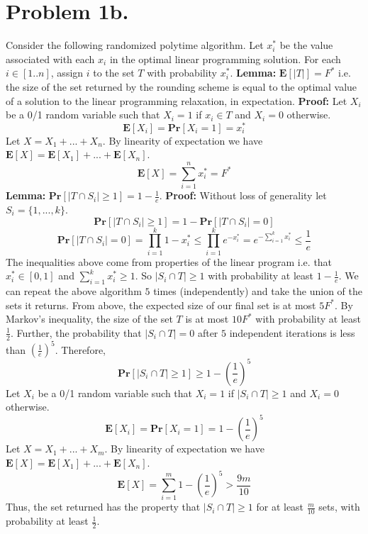 \documentclass[12pt]{article}
\begin{document}
\section*{Problem 1b.}
Consider the following randomized polytime algorithm. Let $x^*_i$ be the value
associated with each $x_i$ in the optimal linear programming solution. For each
$i \in [1..n]$, assign $i$ to the set $T$ with probability $x^*_i$.
\vspace{2mm}
\newline
\textbf{Lemma:} $\textbf{E}[|T|] = F^*$ i.e. the size of the set returned
by the rounding scheme is equal to the optimal value of a solution to the linear
programming relaxation, in expectation.
\vspace{2mm}
\newline
\textbf{Proof:} Let $X_i$ be a 0/1 random variable such that
$X_i = 1$ if $x_i \in T$ and $X_i = 0$ otherwise.
$$\textbf{E}[X_i] = \textbf{Pr}[X_i = 1] = x^*_i$$
Let $X = X_1 + ... + X_n$. By linearity of expectation we have
$\textbf{E}[X] = \textbf{E}[X_1] + ... + \textbf{E}[X_n]$.
$$\textbf{E}[X] = \sum^n_{i=1} x^*_i = F^*$$
\newpage
\noindent
\textbf{Lemma:} $\textbf{Pr}[|T\cap S_i|\ge 1] = 1 - \frac{1}{e}$.
\vspace{2mm}
\newline
\textbf{Proof:} Without loss of generality let $S_i = \{1,...,k\}$.
$$\textbf{Pr}[|T\cap S_i| \ge 1] = 1 - \textbf{Pr}[|T\cap S_i| = 0]$$
$$ \textbf{Pr}[|T\cap S_i| = 0] =
\prod_{i=1}^k 1-x^*_i \le \prod_{i=1}^k e^{-x^*_i}
= e^{-\sum^k_{i=1} x^*_i} \le \frac{1}{e}$$
The inequalities above come from properties of the linear program i.e. that
$x^*_i \in [0,1]$ and $\sum^k_{i=1} x^*_i \ge 1$. So $|S_i \cap T| \ge 1$ with
probability at least $1-\frac{1}{e}$.
\vspace{4mm}
\newline
We can repeat the above algorithm $5$ times (independently) and take the union
of the sets it returns. From above, the expected size of our final set is at
most $5F^*$. By Markov's inequality, the size of the set $T$ is at most
$10F^*$ with probability at least $\frac{1}{2}$. Further, the probability that
$|S_i \cap T| = 0$ after $5$ independent iterations is less than
$\left(\frac{1}{e}\right)^5$. Therefore,
$$\textbf{Pr}[|S_i\cap T| \ge 1] \ge 1 - \left(\frac{1}{e}\right)^5$$
Let $X_i$ be a 0/1 random variable such that $X_i = 1$ if $|S_i \cap T| \ge 1$
and $X_i = 0$ otherwise.
$$\textbf{E}[X_i] = \textbf{Pr}[X_i = 1] = 1 - \left(\frac{1}{e}\right)^5$$
Let $X = X_1 + ... + X_m$. By linearity of expectation we have
$\textbf{E}[X] = \textbf{E}[X_1] + ... + \textbf{E}[X_n]$.
$$\textbf{E}[X] = \sum^m_{i=1} 1 - \left(\frac{1}{e}\right)^5 > \frac{9m}{10}$$
Thus, the set returned has the property that $|S_i\cap T| \ge 1$ for
at least $\frac{m}{10}$ sets, with probability at least $\frac{1}{2}$.
\end{document}
